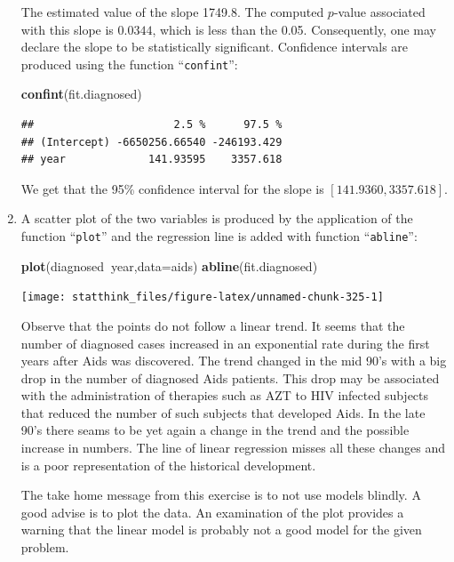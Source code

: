 \documentclass[]{krantz}
\makeatletter
\newenvironment{Shaded}{\begin{snugshade}}{\end{snugshade}}
\newcommand{\DataTypeTok}[1]{\textcolor[rgb]{0.13,0.29,0.53}{#1}}
\newcommand{\KeywordTok}[1]{\textcolor[rgb]{0.13,0.29,0.53}{\textbf{#1}}}
\newcommand{\NormalTok}[1]{#1}
\newcommand{\OperatorTok}[1]{\textcolor[rgb]{0.81,0.36,0.00}{\textbf{#1}}}
\newenvironment{kframe}{%
\medskip{}
\setlength{\fboxsep}{.8em}
 \def\at@end@of@kframe{}%
 \ifinner\ifhmode%
  \def\at@end@of@kframe{\end{minipage}}%
  \begin{minipage}{\columnwidth}%
 \fi\fi%
 \def\FrameCommand##1{\hskip\@totalleftmargin \hskip-\fboxsep
 \colorbox{shadecolor}{##1}\hskip-\fboxsep
     \hskip-\linewidth \hskip-\@totalleftmargin \hskip\columnwidth}%
 \MakeFramed {\advance\hsize-\width
   \@totalleftmargin\z@ \linewidth\hsize
   \@setminipage}}%
 {\par\unskip\endMakeFramed%
 \at@end@of@kframe}
\renewenvironment{Shaded}{\begin{kframe}}{\end{kframe}}
\theoremstyle{definition}
\theoremstyle{definition}
\theoremstyle{definition}
\theoremstyle{remark}
\makeatother
\begin{document}
\begin{enumerate}
  The estimated value of the slope 1749.8. The computed \(p\)-value
  associated with this slope is \(0.0344\), which is less than the 0.05.
  Consequently, one may declare the slope to be statistically significant.
  Confidence intervals are produced using the function ``\texttt{confint}'':

\begin{Shaded}
\begin{Highlighting}[]
\KeywordTok{confint}\NormalTok{(fit.diagnosed)}
\end{Highlighting}
\end{Shaded}

\begin{verbatim}
##                      2.5 %      97.5 %
## (Intercept) -6650256.66540 -246193.429
## year             141.93595    3357.618
\end{verbatim}

  We get that the 95\% confidence interval for the slope is
  \([141.9360, 3357.618]\).
\item
  A scatter plot of the two
  variables is produced by the application of the function ``\texttt{plot}'' and
  the regression line is added with function ``\texttt{abline}'':

\begin{Shaded}
\begin{Highlighting}[]
\KeywordTok{plot}\NormalTok{(diagnosed}\OperatorTok{~}\NormalTok{year,}\DataTypeTok{data=}\NormalTok{aids)}
\KeywordTok{abline}\NormalTok{(fit.diagnosed)}
\end{Highlighting}
\end{Shaded}

  \begin{center}\texttt{[image: statthink\_files/figure-latex/unnamed-chunk-325-1]} \end{center}

  Observe that the
  points do not follow a linear trend. It seems that the number of
  diagnosed cases increased in an exponential rate during the first years
  after Aids was discovered. The trend changed in the mid 90's with a big
  drop in the number of diagnosed Aids patients. This drop may be
  associated with the administration of therapies such as AZT to HIV
  infected subjects that reduced the number of such subjects that
  developed Aids. In the late 90's there seams to be yet again a change in
  the trend and the possible increase in numbers. The line of linear
  regression misses all these changes and is a poor representation of the
  historical development.

  The take home message from this exercise is to not use models blindly. A
  good advise is to plot the data. An examination of the plot provides a
  warning that the linear model is probably not a good model for the given
  problem.
\end{enumerate}
\end{document}
